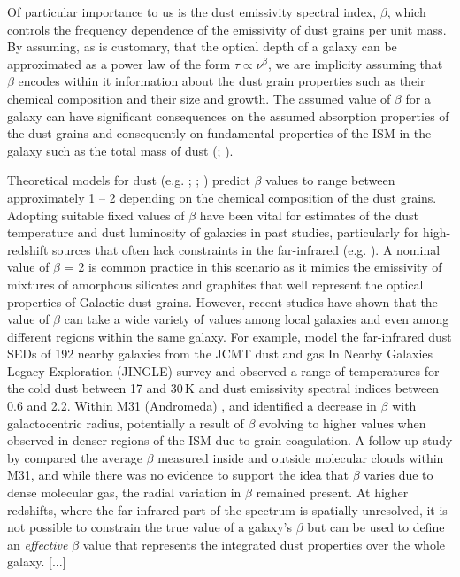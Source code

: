 Of particular importance to us is the dust emissivity spectral index, $\beta$, which controls the frequency dependence of the emissivity of dust grains per unit mass. By assuming, as is customary, that the optical depth of a galaxy can be approximated as a power law of the form $\tau \propto \nu^\beta$, we are implicity assuming that $\beta$ encodes within it information about the dust grain properties such as their chemical composition and their size and growth. The assumed value of $\beta$ for a galaxy can have significant consequences on the assumed absorption properties of the dust grains and consequently on fundamental properties of the ISM in the galaxy such as the total mass of dust (\citealt{Bianchi_2013}; \citealt{Clark_2016}).

Theoretical models for dust (e.g. \citealt{Draine_1984}; \citealt{Draine_2011}; \citealt{Kohler_2015}) predict $\beta$ values to range between approximately 1 -- 2 depending on the chemical composition of the dust grains. Adopting suitable fixed values of $\beta$ have been vital for estimates of the dust temperature and dust luminosity of galaxies in past studies, particularly for high-redshift sources that often lack constraints in the far-infrared (e.g. ). A nominal value of $\beta$ = 2 is common practice in this scenario as it mimics the emissivity of mixtures of amorphous silicates and graphites that well represent the optical properties of Galactic dust grains. However, recent studies have shown that the value of $\beta$ can take a wide variety of values among local galaxies and even among different regions within the same galaxy. For example, \citealt{Lamperti_2019} model the far-infrared dust SEDs of 192 nearby galaxies from the JCMT dust and gas In Nearby Galaxies Legacy Exploration (JINGLE) survey and observed a range of temperatures for the cold dust between 17 and 30\,K and dust emissivity spectral indices between 0.6 and 2.2. Within M31 (Andromeda) \citealt{Smith_2012}, \citealt{Draine_2014} and \citealt{Whitworth_2019} identified a decrease in $\beta$ with galactocentric radius, potentially a result of $\beta$ evolving to higher values when observed in denser regions of the ISM due to grain coagulation. A follow up study by \citealt{Athikkat-Eknath_2022} compared the average $\beta$ measured inside and outside molecular clouds within M31, and while there was no evidence to support the idea that $\beta$ varies due to dense molecular gas, the radial variation in $\beta$ remained present. At higher redshifts, where the far-infrared part of the spectrum is spatially unresolved, it is not possible to constrain the true value of a galaxy's $\beta$ but can be used to define an \textit{effective} $\beta$ value that represents the integrated dust properties over the whole galaxy. [...]

